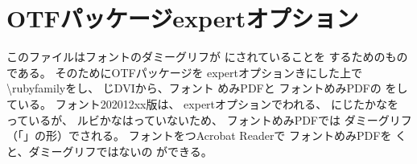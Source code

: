 \documentclass{jsarticle}
\begin{document}
\section{OTFパッケージexpertオプション}

このファイルはフォントのダミーグリフが
にされていることを
するためのものである。
そのためにOTFパッケージを
expertオプションきにした上で
\textbackslash rubyfamilyをし、
じDVIから、フォント
めみPDFと
フォントめみPDFの
をしている。
フォント202012xx版は、
expertオプションでわれる、
にじたかなを
っているが、
ルビかなはっていないため、
フォントめみPDFでは
ダミーグリフ（「」の形）でされる。
フォントをつAcrobat Readerで
フォントめみPDFを
くと、ダミーグリフではないの
ができる。
\end{document}
